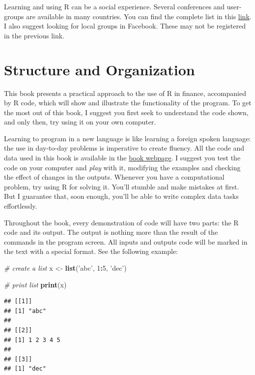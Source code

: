 \documentclass[11pt,]{book}
\newenvironment{Shaded}{\begin{snugshade}}{\end{snugshade}}
\newcommand{\KeywordTok}[1]{\textcolor[rgb]{0.27,0.27,0.27}{\textbf{#1}}}
\newcommand{\DecValTok}[1]{\textcolor[rgb]{0.06,0.06,0.06}{#1}}
\newcommand{\StringTok}[1]{\textcolor[rgb]{0.5,0.5,0.5}{#1}}
\newcommand{\CommentTok}[1]{\textcolor[rgb]{0.56,0.35,0.01}{\textit{#1}}}
\newcommand{\OperatorTok}[1]{\textcolor[rgb]{0.81,0.36,0.00}{\textbf{#1}}}
\newcommand{\NormalTok}[1]{#1}
\begin{document}
Learning and using R can be a social experience. Several conferences and
user-groups are available in many countries. You can find the complete
list in this
\href{https://jumpingrivers.github.io/meetingsR/index.html}{link}. I
also suggest looking for local groups in Facebook. These may not be
registered in the previous link.

\section{Structure and Organization}\label{structure-and-organization}

This book presents a practical approach to the use of R in finance,
accompanied by R code, which will show and illustrate the functionality
of the program. To get the most out of this book, I suggest you first
seek to understand the code shown, and only then, try using it on your
own computer.

Learning to program in a new language is like learning a foreign spoken
language: the use in day-to-day problems is imperative to create
fluency. All the code and data used in this book is available in the
\href{https://sites.google.com/view/pafdr/home}{book webpage}. I suggest
you test the code on your computer and \emph{play} with it, modifying
the examples and checking the effect of changes in the outputs. Whenever
you have a computational problem, try using R for solving it. You'll
stumble and make mistakes at first. But I guarantee that, soon enough,
you'll be able to write complex data tasks effortlessly.

Throughout the book, every demonstration of code will have two parts:
the R code and its output. The output is nothing more than the result of
the commands in the program screen. All inputs and outputs code will be
marked in the text with a special format. See the following example:

\begin{Shaded}
\begin{Highlighting}[]
\CommentTok{# create a list}
\NormalTok{x <-}\StringTok{ }\KeywordTok{list}\NormalTok{(}\StringTok{'abc'}\NormalTok{, }\DecValTok{1}\OperatorTok{:}\DecValTok{5}\NormalTok{, }\StringTok{'dec'}\NormalTok{)}

\CommentTok{# print list}
\KeywordTok{print}\NormalTok{(x)}
\end{Highlighting}
\end{Shaded}

\begin{verbatim}
## [[1]]
## [1] "abc"
## 
## [[2]]
## [1] 1 2 3 4 5
## 
## [[3]]
## [1] "dec"
\end{verbatim}
\end{document}

